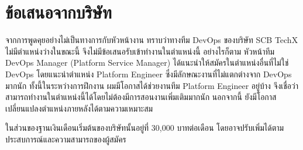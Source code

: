 \section{ข้อเสนอจากบริษัท}
จากการพูดคุยอย่างไม่เป็นทางการกับหัวหน้างาน ทราบว่าทางทีม DevOps ของบริษัท SCB TechX ไม่มีตำแหน่งว่างในขณะนี้ จึงไม่มีข้อเสนอรับเข้าทำงานในตำแหน่งนี้ อย่างไรก็ตาม หัวหน้าทีม DevOps Manager (Platform Service Manager) ได้แนะนำให้สมัครในตำแหน่งอื่นที่ไม่ใช่ DevOps โดยแนะนำตำแหน่ง Platform Engineer ซึ่งมีลักษณะงานที่ไม่แตกต่างจาก DevOps มากนัก ทั้งนี้ในระหว่างการฝึกงาน ผมมีโอกาสได้ช่วยงานทีม Platform Engineer อยู่บ้าง จึงเชื่อว่าสามารถทำงานในตำแหน่งนี้ได้โดยไม่ต้องมีการสอนงานเพิ่มเติมมากนัก นอกจากนี้ ยังมีโอกาสเปลี่ยนแปลงตำแหน่งภายหลังได้ตามความเหมาะสม

ในส่วนของฐานเงินเดือนเริ่มต้นของบริษัทนั้นอยู่ที่ 30,000 บาทต่อเดือน โดยอาจปรับเพิ่มได้ตามประสบการณ์และความสามารถของผู้สมัคร
